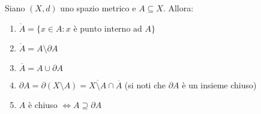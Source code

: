 \begin{theorem}
    Siano $(X,d)$ uno spazio metrico e $A \subseteq X$. Allora:
    \begin{enumerate}
        \item $\mathring A = \{x \in A : x \text{ è punto interno ad }A\}$
        \item $\mathring A = A \setminus \partial A$
        \item $\overline{A} = A \cup \partial A$
        \item $\partial A = \partial (X\setminus A)= \overline{X\setminus A}\cap\overline{A}$ (si noti che $\partial A$ è un insieme chiuso)
        \item $A$ è chiuso $\iff A \supseteq \partial A$
    \end{enumerate}
\end{theorem}

